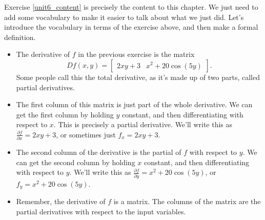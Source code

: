 Exercise \ref{unit6_content} is precisely the content to this chapter.  We just need to add some vocabulary to make it easier to talk about what we just did. Let's introduce the vocabulary in terms of the exercise above, and then make a formal definition.
\begin{itemize}
 \item The derivative of $f$ in the previous exercise is the matrix 
 $$Df(x,y) = \begin{bmatrix}
  2xy+3& 
  x^2+20\cos(5y)
 \end{bmatrix}.$$ 
 Some people call this the total derivative, as it's made up of two parts, called partial derivatives. 
 \item The first column of this matrix is just part of the whole derivative. We can get the first column by holding $y$ constant, and then differentiating with respect to $x$. This is precisely a partial derivative.  We'll write this as $\frac{\partial f}{\partial x} = 2xy+3$, or sometimes just $f_x = 2xy+3$.
 \item The second column of the derivative is the partial of $f$ with respect to $y$. We can get the second column by holding $x$ constant, and then differentiating with respect to $y$. We'll write this as $\frac{\partial f}{\partial y} = x^2+20\cos(5y)$, or $f_y = x^2+20\cos(5y)$.
 \item Remember, the derivative of $f$ is a matrix. The columns of the matrix are the partial derivatives with respect to the input variables. 
\end{itemize}

